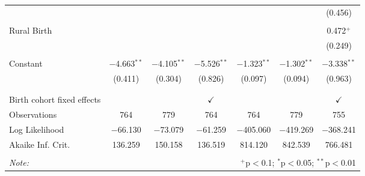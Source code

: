 \begin{table}[!htbp]
\begin{tabular}{@{\extracolsep{5pt}}lcccccc}
  &  &  &  &  &  & (0.456) \\ 
  & & & & & & \\ 
 Rural Birth &  &  &  &  &  & 0.472$^{+}$ \\ 
  &  &  &  &  &  & (0.249) \\ 
  & & & & & & \\ 
 Constant & $-$4.663$^{**}$ & $-$4.105$^{**}$ & $-$5.526$^{**}$ & $-$1.323$^{**}$ & $-$1.302$^{**}$ & $-$3.338$^{**}$ \\ 
  & (0.411) & (0.304) & (0.826) & (0.097) & (0.094) & (0.963) \\ 
  & & & & & & \\ 
\hline \\[-1.8ex] 
Birth cohort fixed effects &  &  & $\checkmark$ &  &  & $\checkmark$ \\ 
Observations & 764 & 779 & 764 & 764 & 779 & 755 \\ 
Log Likelihood & $-$66.130 & $-$73.079 & $-$61.259 & $-$405.060 & $-$419.269 & $-$368.241 \\ 
Akaike Inf. Crit. & 136.259 & 150.158 & 136.519 & 814.120 & 842.539 & 766.481 \\ 
\hline 
\hline \\[-1.8ex] 
\textit{Note:}  & \multicolumn{6}{r}{$^{+}$p$<$0.1; $^{*}$p$<$0.05; $^{**}$p$<$0.01}} \\ 
\end{tabular} 
\end{table} 
